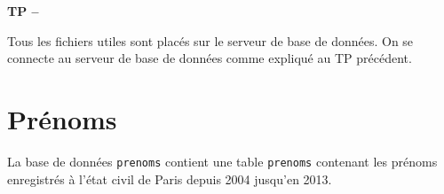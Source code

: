

%



\begin{center}
{\Large\bf TP \no {\numero} -- \descrip}
\end{center}
 
Tous les fichiers utiles sont placés sur le serveur de base de données. On se connecte au serveur de base de données comme expliqué au TP précédent.

% 
% 
%  
%  
%  
%  

\section{Prénoms}

La base de données \verb|prenoms| contient une table \verb|prenoms| contenant les prénoms enregistrés à l'état civil de Paris depuis 2004 jusqu'en 2013.

